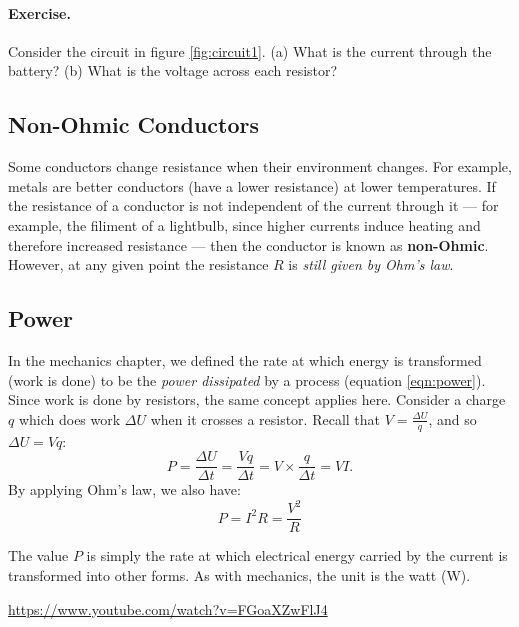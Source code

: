 \documentclass[a4paper]{amsbook}
\begin{document}
\paragraph{Exercise.} Consider the circuit in figure \ref{fig:circuit1}. (a) What is the current through the battery? (b) What is the voltage
across each resistor?

\subsection{Non-Ohmic Conductors}
Some conductors change resistance when their environment changes. For example, metals are better conductors (have a lower
resistance) at lower temperatures. If the resistance of a conductor is not independent of the current through it --- for example,
the filiment of a lightbulb, since higher currents induce heating and therefore increased resistance --- then the conductor
is known as \textbf{non-Ohmic}. However, at any given point the resistance $ R $ is \textit{still given by Ohm's law}.

\subsection{Power}
In the mechanics chapter, we defined the rate at which energy is transformed (work is done) to be the \textit{power dissipated}
by a process (equation \ref{eqn:power}). Since work is done by resistors, the same concept applies here. Consider a charge $ q $
which does work $ \Delta U $ when it crosses a resistor. Recall that $ V = \frac{\Delta U}{q} $, and so $ \Delta U = Vq $:
\begin{equation}
  P = \frac{\Delta U}{\Delta t} = \frac{Vq}{\Delta t} = V \times \frac{q}{\Delta t} = VI.
\end{equation}
By applying Ohm's law, we also have:
\begin{equation}
  P = I^2 R = \frac{V^2}{R}
\end{equation}

The value $ P $ is simply the rate at which electrical energy carried by the current is transformed into other forms. As with mechanics,
the unit is the watt (W).

\begin{center}
\begin{tcolorbox}[width=0.8\textwidth,colback={red},title={\textbf{Go and watch...}},colbacktitle=yellow,coltitle=blue]
  \textcolor{white}{\url{https://www.youtube.com/watch?v=FGoaXZwFlJ4}}
\end{tcolorbox}
\end{center}
\end{document}
